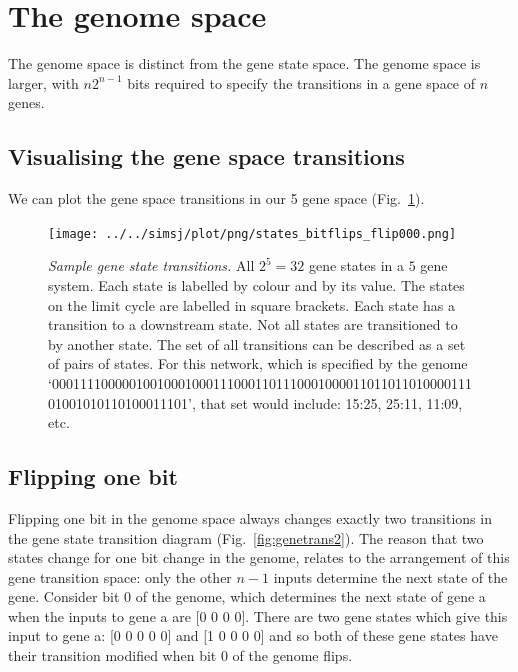 \documentclass[11pt, a4paper]{article}
\begin{document}
\section{The genome space}

The genome space is distinct from the gene state space. The genome
space is larger, with $n 2^{n-1}$ bits required to specify the
transitions in a gene space of $n$ genes.

\subsection{Visualising the gene space transitions}

We can plot the gene space transitions in our 5 gene space (Fig.~\ref{fig:genetrans}).

\begin{figure}
\begin{center}
\texttt{[image: ../../simsj/plot/png/states\_bitflips\_flip000.png]}
\caption{\emph{Sample gene state transitions.} All $2^5=32$ gene
states in a $5$ gene system. Each state is labelled by colour and by
its value. The states on the limit cycle are labelled in square
brackets. Each state has a transition to a downstream state. Not all
states are transitioned to by another state. The set of all
transitions can be described as a set of pairs of states. For this
network, which is specified by the genome `00011110000010010001000111000110111000100001101101101000011101001010110100011101', that set would include: 15:25, 25:11, 11:09, etc.}
\label{fig:genetrans}
\end{center}
\end{figure}

\subsection{Flipping one bit}

Flipping one bit in the genome space always changes exactly two
transitions in the gene state transition diagram
(Fig.~\ref{fig:genetrans2}). The reason that two states change for one
bit change in the genome, relates to the arrangement of this gene
transition space: only the other $n-1$ inputs determine the next state
of the gene. Consider bit 0 of the genome, which determines the next
state of gene a when the inputs to gene a are [0 0 0 0]. There are two
gene states which give this input to gene a: [0 0 0 0 0] and [1 0 0 0
0] and so both of these gene states have their transition modified
when bit 0 of the genome flips.
\end{document}
